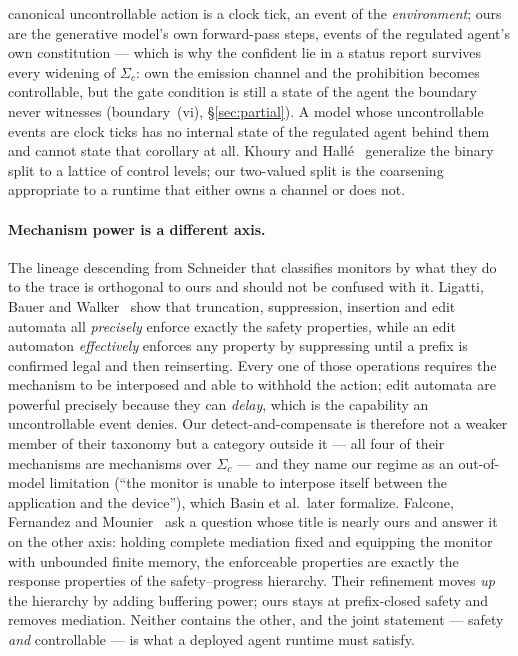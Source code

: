 \documentclass[11pt,a4paper]{article}  \usepackage{mdframed} \usepackage{graphicx} \usepackage{tabularx}
\begin{document}
canonical uncontrollable action is a clock tick, an event of the \emph{environment}; ours are the generative model's own
forward-pass steps, events of the regulated agent's own constitution --- which is why the confident lie in a status report
survives every widening of $\Sigma_c$: own the emission channel and the prohibition becomes controllable, but the gate
condition is still a state of the agent the boundary never witnesses (boundary~(vi), \S\ref{sec:partial}). A model whose
uncontrollable events are clock ticks has no internal state of the regulated agent behind them and cannot state that
corollary at all. Khoury and Hall\'e~\cite{kh15}
generalize the binary split to a lattice of control levels; our two-valued split is the coarsening appropriate to a runtime
that either owns a channel or does not.

\paragraph{Mechanism power is a different axis.} The lineage descending from Schneider that classifies monitors by what they
do to the trace is orthogonal to ours and should not be confused with it. Ligatti, Bauer and Walker~\cite{lbw05} show that
truncation, suppression, insertion and edit automata all \emph{precisely} enforce exactly the safety properties, while an
edit automaton \emph{effectively} enforces any property by suppressing until a prefix is confirmed legal and then
reinserting. Every one of those operations requires the mechanism to be interposed and able to withhold the action; edit
automata are powerful precisely because they can \emph{delay}, which is the capability an uncontrollable event denies. Our
detect-and-compensate is therefore not a weaker member of their taxonomy but a category outside it --- all four of their
mechanisms are mechanisms over $\Sigma_c$ --- and they name our regime as an out-of-model limitation (``the monitor is
unable to interpose itself between the application and the device''), which Basin et al.\ later formalize. Falcone, Fernandez
and Mounier~\cite{ffm12} ask a question whose title is nearly ours and answer it on the other axis: holding complete
mediation fixed and equipping the monitor with unbounded finite memory, the enforceable properties are exactly the response
properties of the safety--progress hierarchy. Their refinement moves \emph{up} the hierarchy by adding buffering power; ours
stays at prefix-closed safety and removes mediation. Neither contains the other, and the joint statement --- safety
\emph{and} controllable --- is what a deployed agent runtime must satisfy.
\end{document}

